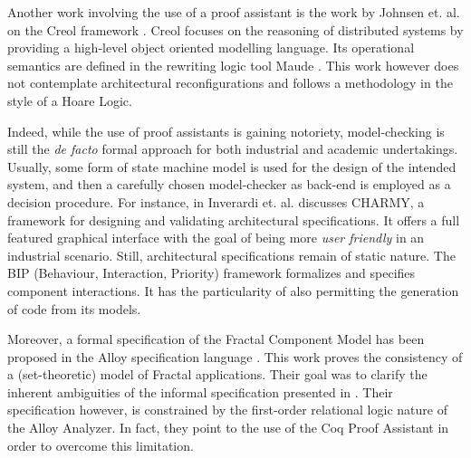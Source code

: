 	
	Another work involving the use of a proof assistant is the work by Johnsen et. al. 
	on the \textsf{Creol} framework \cite{johnsen06tcs}. \textsf{Creol} focuses on
	the reasoning of distributed systems by providing a high-level object oriented
	modelling language. Its operational semantics are defined in the rewriting logic tool 
	Maude \cite{Maude2:03}. This work however does not contemplate architectural 
	reconfigurations and follows a methodology in the style of a Hoare Logic. 	
		
    

   	
	Indeed, while the use of proof assistants is gaining notoriety, model-checking is still
	the \textit{de facto} formal approach for both industrial and academic undertakings.
	Usually, some form of state machine model is used for the design of the intended
	system,  and then a carefully chosen model-checker as back-end is employed as
	a decision procedure. %
	For instance, in \cite{p.2005-1} Inverardi et. al. 
	discusses \textsf{CHARMY}, a framework for designing and validating architectural 
	specifications. It offers a full featured graphical interface with the goal of being more 
	\textit{user friendly} in an industrial scenario. Still,
	architectural specifications remain of static nature. 
	The BIP (Behaviour, Interaction, Priority) 
	framework \cite{BBB+11a} formalizes and specifies component interactions.
	It has the particularity of also permitting the generation of code from its models.
	

   	Moreover, a formal specification of the Fractal Component Model has 
   	been proposed in the  Alloy specification language \cite{MERLE:2008:INRIA-00338987:1}. 
	This work proves the consistency of a (set-theoretic) model of Fractal applications. 	 
	Their goal was to clarify the inherent ambiguities of the informal specification presented
  	in \cite{fractalSpec}. Their specification however, is constrained by the first-order relational logic nature 
   	of the Alloy Analyzer. In fact, they point to the use of the Coq Proof Assistant in order 
   	to overcome this limitation.	
	
	


